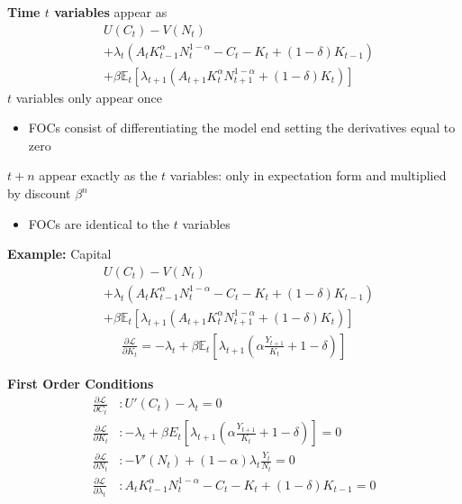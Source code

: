 \documentclass{beamer}
\begin{document}
\begin{frame}
 \textbf{Time $t$ variables} appear as  
\begin{align}
  &U(C_t)-V(N_t)  \\ \nonumber
  &+ \lambda_t(A_tK^\alpha_{t-1}N^{1-\alpha}_t -C_t -K_t + (1-\delta)K_{t-1})  \\ \nonumber
  &+ \beta \mathbb{E}_t[\lambda_{t+1}(A_{t+1}K^\alpha_{t}N^{1-\alpha}_{t+1}+(1-\delta)K_t)]
\end{align}
   $t$ variables only appear once
  \begin{itemize}
  \item FOCs consist of differentiating the model end setting the derivatives equal to zero  
\end{itemize}
\medskip
$t+n$ appear exactly as the $t$ variables: only in expectation form and multiplied by discount $\beta^n$
\begin{itemize}
  \item FOCs are identical to the $t$ variables
\end{itemize}
\end{frame}


\begin{frame}
  \textbf{Example:} Capital
\begin{align}
  & U(C_t)-V(N_t)  \\ \nonumber
  &+ \lambda_t(A_tK^\alpha_{t-1}N^{1-\alpha}_t -C_t -K_t + (1-\delta)K_{t-1})  \\ \nonumber
  &+ \beta \mathbb{E}_t[\lambda_{t+1}(A_{t+1}K^\alpha_{t}N^{1-\alpha}_{t+1}+(1-\delta)K_t)]
\end{align}
\begin{align}
  \frac{\partial \mathcal{L}}{\partial K_t}=-\lambda_t + \beta \mathbb{E}_t\left[\lambda_{t+1} \left( \alpha\frac{Y_{t+1}}{K_t}+1-\delta \right) \right]
\end{align}
\end{frame}

\begin{frame}
  \textbf{First Order Conditions}  
\begin{align}
  \frac{\partial \mathcal{L}}{\partial C_t}&: U'(C_t)-\lambda_t=0\\
  \frac{\partial \mathcal{L}}{\partial K_t}&: -\lambda_t + \beta E_t\left[\lambda_{t+1} \left( \alpha\frac{Y_{t+1}}{K_t}+1-\delta \right) \right] =0\\
  \frac{\partial \mathcal{L}}{\partial N_t}&: -V'(N_t) + (1-\alpha) \lambda_t \frac{Y_t}{N_t}=0\\
  \frac{\partial \mathcal{L}}{\partial \lambda_t}&: A_tK^\alpha_{t-1}N^{1-\alpha}_t - C_t - K_t + (1-\delta)K_{t-1} =0
\end{align}
\end{frame}
\end{document}
